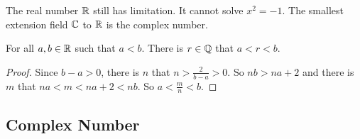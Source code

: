 The real number $\mathbb{R}$ still has limitation. It cannot solve $x^2 = -1$. The smallest extension field $\mathbb{C}$ to $\mathbb{R}$ is the complex number.

\begin{theorem}
    For all $a,b \in \mathbb{R}$ such that $a < b$. There is $r \in \mathbb{Q}$ that $a < r < b$.
\end{theorem}
\begin{proof}
    Since $b - a > 0$, there is $n$ that $n > \frac{2}{b-a} > 0$. So $nb > na + 2$ and there is $m$ that $na < m < na + 2 < nb$. So $a < \frac{m}{n} < b$.
\end{proof}



\subsection{Complex Number}


